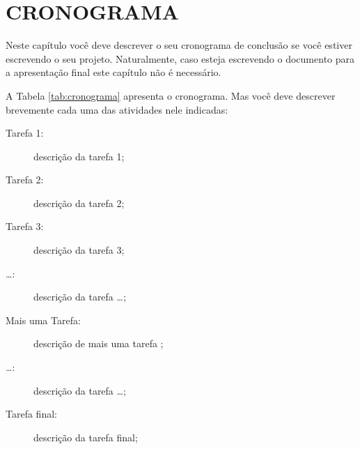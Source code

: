 \newpage
\chapter{CRONOGRAMA}\label{cap:cronograma}

Neste capítulo você deve descrever o seu cronograma de conclusão se você estiver escrevendo o seu projeto. Naturalmente, caso esteja escrevendo o documento para a apresentação final este capítulo não é necessário.


A Tabela \ref{tab:cronograma} apresenta o cronograma. Mas você deve descrever brevemente cada uma das atividades nele indicadas: 
\begin{description}
	\item[Tarefa 1:] descrição da tarefa 1;
	\item[Tarefa 2:] descrição da tarefa 2;
	\item[Tarefa 3:] descrição da tarefa 3;
	\item[\ldots:] descrição da tarefa \ldots;
	\item[Mais uma Tarefa:] descrição de mais uma tarefa ;
	\item[\ldots:] descrição da tarefa \ldots;
	\item[Tarefa final:] descrição da tarefa final;
\end{description}


